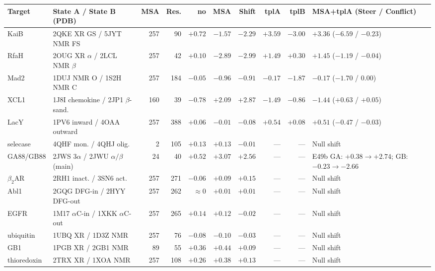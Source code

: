 \documentclass[10pt,a4paper]{article}
\begin{document}
\begin{table}[!ht]
\centering
\scriptsize
\begin{tabularx}{\textwidth}{l Y r r r r r r r l}
\toprule
\textbf{Target} & \textbf{State A / State B (PDB)} & \textbf{MSA} & \textbf{Res.} & \textbf{no} & \textbf{MSA} & \textbf{Shift} & \textbf{tplA} & \textbf{tplB} & \textbf{MSA+tplA (Steer / Conflict)} \\
\midrule
KaiB & 2QKE XR GS / 5JYT NMR FS & 257 & 90 & $+0.72$ & $-1.57$ & $-2.29$ & $+3.59$ & $-3.00$ & $+3.36$ ($-6.59$ / $-0.23$) \\
RfaH & 2OUG XR $\alpha$ / 2LCL NMR $\beta$ & 257 & 42 & $+0.10$ & $-2.89$ & $-2.99$ & $+1.49$ & $+0.30$ & $+1.45$ ($-1.19$ / $-0.04$) \\
Mad2 & 1DUJ NMR O / 1S2H NMR C & 257 & 184 & $-0.05$ & $-0.96$ & $-0.91$ & $-0.17$ & $-1.87$ & $-0.17$ ($-1.70$ / $0.00$) \\
XCL1 & 1J8I chemokine / 2JP1 $\beta$-sand. & 160 & 39 & $-0.78$ & $+2.09$ & $+2.87$ & $-1.49$ & $-0.86$ & $-1.44$ ($+0.63$ / $+0.05$) \\
LacY & 1PV6 inward / 4OAA outward & 257 & 388 & $+0.06$ & $-0.01$ & $-0.08$ & $+0.54$ & $+0.08$ & $+0.51$ ($-0.47$ / $-0.03$) \\
selecase & 4QHF mon. / 4QHJ olig. & 2 & 105 & $+0.13$ & $+0.13$ & $-0.01$ & --- & --- & Null shift \\
GA88/GB88 & 2JWS $3\alpha$ / 2JWU $\alpha/\beta$ (main) & 24 & 40 & $+0.52$ & $+3.07$ & $+2.56$ & --- & --- & E49b GA: $+0.38\rightarrow+2.74$; GB: $-0.23\rightarrow-2.66$ \\
$\beta_2$AR & 2RH1 inact. / 3SN6 act. & 257 & 271 & $-0.06$ & $+0.09$ & $+0.15$ & --- & --- & Null shift \\
Abl1 & 2GQG DFG-in / 2HYY DFG-out & 257 & 262 & $\approx 0$ & $+0.01$ & $+0.01$ & --- & --- & Null shift \\
EGFR & 1M17 $\alpha$C-in / 1XKK $\alpha$C-out & 257 & 265 & $+0.14$ & $+0.12$ & $-0.02$ & --- & --- & Null shift \\
ubiquitin & 1UBQ XR / 1D3Z NMR & 257 & 76 & $-0.08$ & $-0.10$ & $-0.03$ & --- & --- & Null shift \\
GB1 & 1PGB XR / 2GB1 NMR & 89 & 55 & $+0.36$ & $+0.44$ & $+0.09$ & --- & --- & Null shift \\
thioredoxin & 2TRX XR / 1XOA NMR & 257 & 108 & $+0.26$ & $+0.38$ & $+0.13$ & --- & --- & Null shift \\
\bottomrule
\end{tabularx}
\end{table}
\end{document}
